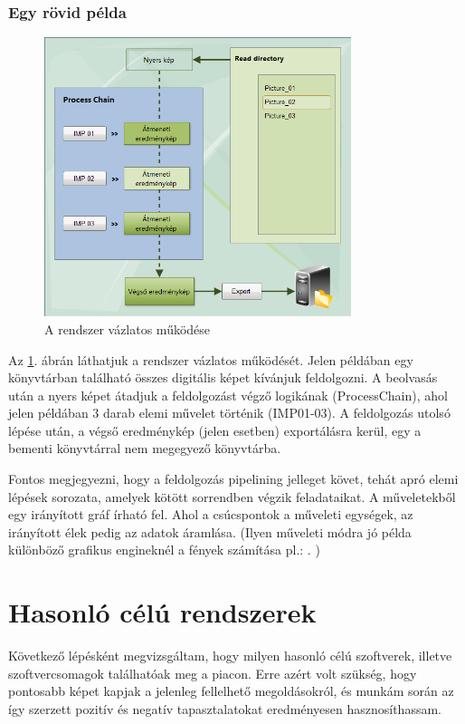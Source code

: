 \documentclass[a4paper,12pt,oneside]{report}
\begin{document}
\subsubsection{Egy rövid példa}
\begin{figure}[h]
	\begin{center}
	  \includegraphics[width=0.8\textwidth]{read-dir-processing_IMP.jpg}
    \end{center}
	  \caption{A rendszer vázlatos működése}
	  \label{fig:bimg_usecase_brief}
\end{figure}


Az  \ref{fig:bimg_usecase_brief}. ábrán láthatjuk a rendszer vázlatos működését. Jelen példában egy könyvtárban található összes digitális képet kívánjuk feldolgozni. A beolvasás után a nyers képet átadjuk a feldolgozást végző logikának (ProcessChain), ahol jelen példában 3 darab elemi művelet történik (IMP01-03). A feldolgozás utolsó lépése után, a végső eredménykép (jelen esetben) exportálásra kerül, egy a bementi könyvtárral nem megegyező könyvtárba.

Fontos megjegyezni, hogy a feldolgozás pipelining \cite{book:pipelining_def} jelleget követ, tehát apró elemi lépések sorozata, amelyek kötött sorrendben végzik feladataikat. A műveletekből egy irányított gráf írható fel. Ahol a csúcspontok a műveleti egységek, az irányított élek pedig az adatok áramlása. (Ilyen műveleti módra jó példa különböző grafikus engineknél a fények számítása pl.: \cite{website:valve_shading_tree}. )

\section{Hasonló célú rendszerek}
Következő lépésként megvizsgáltam, hogy milyen hasonló célú szoftverek, illetve szoftvercsomagok találhatóak meg a piacon. Erre azért volt szükség, hogy pontosabb képet kapjak a jelenleg fellelhető megoldásokról, és munkám során az így szerzett pozitív és negatív tapasztalatokat eredményesen hasznosíthassam.
\end{document}
